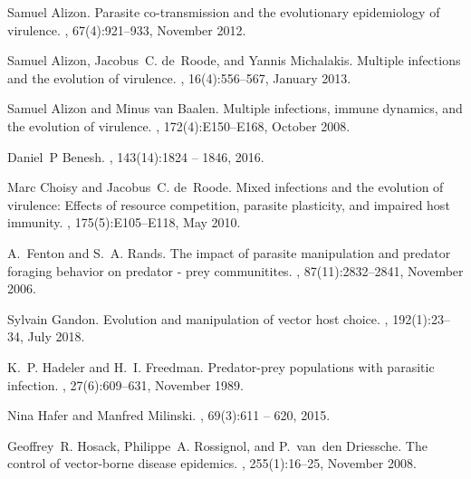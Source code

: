 \documentclass[11pt]{article}
\begin{document}

%

\begin{thebibliography}{10}
\providecommand{\natexlab}[1]{#1}


Samuel Alizon.
\newblock Parasite co-transmission and the evolutionary epidemiology of
  virulence.
, 67(4):921--933, November 2012.

Samuel Alizon, Jacobus~C. de~Roode, and Yannis Michalakis.
\newblock Multiple infections and the evolution of virulence.
, 16(4):556--567, January 2013.

Samuel Alizon and Minus van Baalen.
\newblock Multiple infections, immune dynamics, and the evolution of virulence.
, 172(4):E150--E168, October 2008.

Daniel~P Benesh.
, 143(14):1824 -- 1846, 2016.

Marc Choisy and Jacobus~C. de~Roode.
\newblock Mixed infections and the evolution of virulence: Effects of resource
  competition, parasite plasticity, and impaired host immunity.
, 175(5):E105--E118, May 2010.

A.~Fenton and S.~A. Rands.
\newblock The impact of parasite manipulation and predator foraging behavior on
  predator - prey communitites.
, 87(11):2832--2841, November 2006.

Sylvain Gandon.
\newblock Evolution and manipulation of vector host choice.
, 192(1):23--34, July 2018.

K.~P. Hadeler and H.~I. Freedman.
\newblock Predator-prey populations with parasitic infection.
, 27(6):609--631, November 1989.

Nina Hafer and Manfred Milinski.
, 69(3):611 -- 620, 2015.

Geoffrey~R. Hosack, Philippe~A. Rossignol, and P.~van~den Driessche.
\newblock The control of vector-borne disease epidemics.
, 255(1):16--25, November 2008.


\end{thebibliography}
\end{document}
